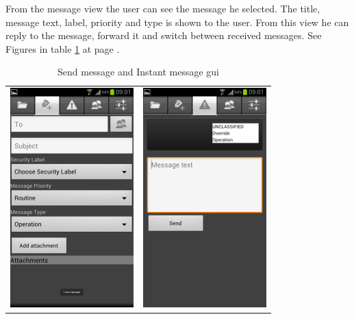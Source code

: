 From the message view the user can see the message he selected. The title, message text, label, priority and type is shown to the user. From this view he can reply to the message, forward it and switch between received messages. See Figures in table \ref{tab:sendinstantmessage} at page \pageref{tab:sendinstantmessage}.
\newline
\begin{table}[h!]
\begin{center}
\begin{tabular}{cc}
\includegraphics{sendmessage} & \includegraphics{instamessage}
\end{tabular}
\caption{Send message and Instant message gui} \label{tab:sendinstantmessage}
\end{center}
\end{table}

